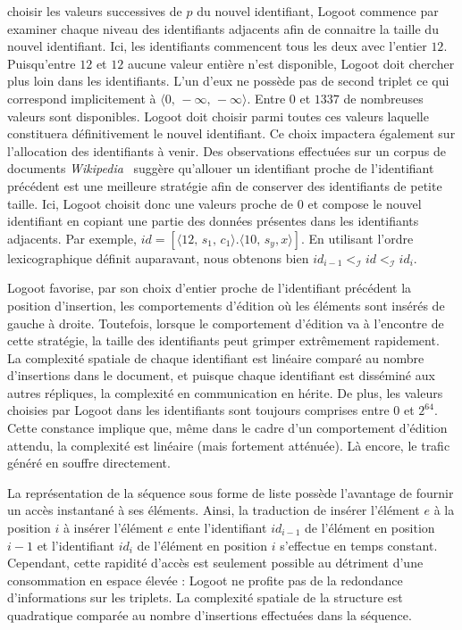 choisir les valeurs successives de $p$ du nouvel identifiant, Logoot commence
par examiner chaque niveau des identifiants adjacents afin de connaitre la
taille du nouvel identifiant. Ici, les identifiants commencent tous les deux
avec l'entier $12$.  Puisqu'entre $12$ et $12$ aucune valeur entière n'est
disponible, Logoot doit chercher plus loin dans les identifiants. L'un d'eux ne
possède pas de second triplet ce qui correspond implicitement à
$\langle 0,\, -\infty ,\, -\infty \rangle$.  Entre $0$ et $1337$ de nombreuses
valeurs sont disponibles.  Logoot doit choisir parmi toutes ces valeurs laquelle
constituera définitivement le nouvel identifiant. Ce choix impactera également
sur l'allocation des identifiants à venir.
Des observations effectuées sur un corpus de documents
\emph{Wikipedia}~\cite{wikipedia} suggère qu'allouer un identifiant proche de
l'identifiant précédent est une meilleure stratégie afin de conserver des
identifiants de petite taille.  Ici, Logoot choisit donc une valeurs proche de
$0$ et compose le nouvel identifiant en copiant une partie des données présentes
dans les identifiants adjacents. Par exemple,
$id = [\langle 12,\, s_1,\,c_1 \rangle.\langle 10,\,s_y, x\rangle]$.  En
utilisant l'ordre lexicographique définit auparavant, nous obtenons bien
$id_{i-1} <_\mathcal{I} id <_\mathcal{I} id_i$.

\noindent Logoot favorise, par son choix d'entier proche de l'identifiant
précédent la position d'insertion, les comportements d'édition où les éléments
sont insérés de gauche à droite. Toutefois, lorsque le comportement d'édition va
à l'encontre de cette stratégie, la taille des identifiants peut grimper
extrêmement rapidement. La complexité spatiale de chaque identifiant est
linéaire comparé au nombre d'insertions dans le document, et puisque chaque
identifiant est disséminé aux autres répliques, la complexité en communication
en hérite. De plus, les valeurs choisies par Logoot dans les identifiants sont
toujours comprises entre $0$ et $2^{64}$. Cette constance implique que, même
dans le cadre d'un comportement d'édition attendu, la complexité est linéaire
(mais fortement atténuée). Là encore, le trafic généré en souffre directement.

\noindent La représentation de la séquence sous forme de liste possède
l'avantage de fournir un accès instantané à ses éléments. Ainsi, la traduction
de \og insérer l'élément $e$ à la position $i$ \fg à \og insérer l'élément $e$
ente l'identifiant $id_{i-1}$ de l'élément en position $i-1$ et l'identifiant
$id_i$ de l'élément en position $i$ \fg s'effectue en temps constant.
Cependant, cette rapidité d'accès est seulement possible au détriment d'une
consommation en espace élevée : Logoot ne profite pas de la redondance
d'informations sur les triplets. La complexité spatiale de la structure est
quadratique comparée au nombre d'insertions effectuées dans la séquence.

